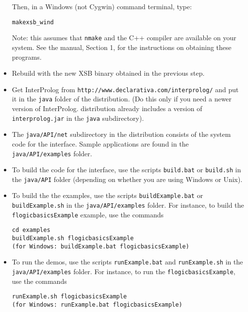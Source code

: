 \begin{itemize}
  Then, in a Windows (not Cygwin) command terminal, type:
\begin{verbatim}
makexsb_wind  
\end{verbatim}
  Note: this assumes that {\tt nmake} and the C++ compiler are available on
  your system. See the \FLORA manual, Section 1, for the instructions on
  obtaining these programs.
\item Rebuild \FLORA with the new XSB binary obtained in the
previous step.
\item Get InterProlog from {\tt http://www.declarativa.com/interprolog/}
and put it in the {\tt java}  folder of the \FLORA distribution.
(Do this only if you need a newer version of InterProlog. \FLORA
distribution already includes a version of {\tt interprolog.jar} in the
{\tt java} subdirectory).
\item The {\tt java/API/net} subdirectory in the \FLORA distribution
  consists of the system code for the interface.
  Sample applications are found in the {\tt java/API/examples}  folder.
\item To build the code for the interface, use the scripts {\tt build.bat} or
  {\tt build.sh} in the {\tt java/API}  folder (depending on whether you are
  using Windows or Unix).
\item To build the the examples, use the scripts
  {\tt buildExample.bat} or  {\tt buildExample.sh} in the {\tt java/API/examples}
  folder. For instance, to
  build the {\tt flogicbasicsExample} example, use the commands
\begin{verbatim}
cd examples
buildExample.sh flogicbasicsExample
(for Windows: buildExample.bat flogicbasicsExample)
\end{verbatim}
\item To run the demos, use the scripts
{\tt runExample.bat} and  {\tt runExample.sh}  in the {\tt java/API/examples}
folder. For instance, to
run the {\tt flogicbasicsExample},  use the commands
\begin{verbatim}
runExample.sh flogicbasicsExample
(for Windows: runExample.bat flogicbasicsExample)
\end{verbatim}
\end{itemize}


